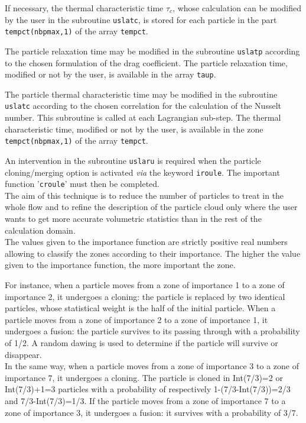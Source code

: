{{\noindent
If necessary, the thermal characteristic time $\tau_c$, whose calculation can be modified by the user in the subroutine
\texttt{uslatc}, is stored for each particle in the part \texttt{tempct(nbpmax,1)} of the array \texttt{tempct}.


\noindent
The particle relaxation time may be modified in the subroutine \texttt{uslatp} according to the chosen formulation of the drag coefficient. The particle relaxation time, modified or not by the user, is available in the array \texttt{taup}.



\noindent
The particle thermal characteristic time may be modified in the subroutine \texttt{uslatc} according to the chosen correlation for the calculation of the
Nusselt number. This subroutine is called at each Lagrangian sub-step. The thermal characteristic time, modified or not by the user, is available in the zone \texttt{tempct(nbpmax,1)} of the array \texttt{tempct}.




\noindent
An intervention in the subroutine \texttt{uslaru} is required when the particle
cloning/merging option is activated {\em via} the keyword \texttt{iroule}. The
important function '\texttt{croule}' must then be completed. \\
The aim of this technique is to reduce the number of particles to treat in
the whole flow and to refine the description of the particle cloud only
where the user wants to get more accurate volumetric statistics than in the
rest of the calculation domain. \\
The values given to the importance function are strictly positive real
numbers allowing to classify the zones according to their
importance. The higher the value given to the importance function, the
more important the zone.

\noindent
For instance, when a particle moves from a zone of importance 1 to a
zone of importance 2, it undergoes a cloning: the particle is replaced by two
identical particles, whose statistical weight is the half of the initial
particle. When a particle moves from a zone of importance 2 to a zone of
importance 1, it undergoes a fusion: the particle survives to its passing
through with a probability of 1/2. A random dawing is used to
determine if the particle will survive or disappear.\\
In the same way, when a particle moves from a zone of importance 3 to a
zone of importance 7, it undergoes a cloning. The particle is cloned in
Int(7/3)=2 or Int(7/3)+1=3 particles with a probability of respectively
1-(7/3-Int(7/3))=2/3 and 7/3-Int(7/3)=1/3. If the particle moves from a
zone of importance 7 to a zone of importance 3, it undergoes a fusion:
it survives with a probability of 3/7.

}}
